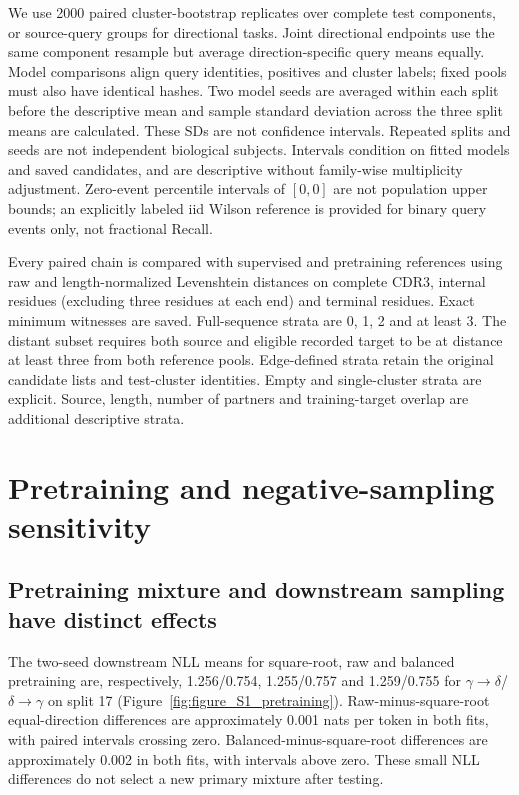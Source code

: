 \documentclass[a4paper,11pt]{article}
\newcommand{\gtd}{\ensuremath{\gamma\!\rightarrow\!\delta}}
\newcommand{\dtg}{\ensuremath{\delta\!\rightarrow\!\gamma}}
\begin{document}
We use 2000 paired cluster-bootstrap replicates over complete test components,
or source-query groups for directional tasks. Joint directional endpoints use
the same component resample but average direction-specific query means equally.
Model comparisons align query identities, positives and cluster labels; fixed
pools must also have identical hashes. Two model seeds are averaged within each
split before the descriptive mean and sample standard deviation across the
three split means are calculated. These SDs are not confidence intervals.
Repeated splits and seeds are not independent biological subjects. Intervals
condition on fitted models and saved candidates, and are descriptive without
family-wise multiplicity adjustment. Zero-event percentile intervals of $[0,0]$
are not population upper bounds; an explicitly labeled iid Wilson reference is
provided for binary query events only, not fractional Recall.

Every paired chain is compared with supervised and pretraining references using
raw and length-normalized Levenshtein distances on complete CDR3, internal
residues (excluding three residues at each end) and terminal residues. Exact
minimum witnesses are saved. Full-sequence strata are 0, 1, 2 and at least 3.
The distant subset requires both source and eligible recorded target to be at
distance at least three from both reference pools. Edge-defined strata retain
the original candidate lists and test-cluster identities. Empty and single-cluster
strata are explicit. Source, length, number of partners and training-target
overlap are additional descriptive strata.


\section{Pretraining and negative-sampling sensitivity}
\subsection{Pretraining mixture and downstream sampling have distinct effects}
The two-seed downstream NLL means for square-root, raw and balanced pretraining
are, respectively, 1.256/0.754, 1.255/0.757 and 1.259/0.755 for \gtd{}/\dtg{}
on split 17 (Figure~\ref{fig:figure_S1_pretraining}). Raw-minus-square-root
equal-direction differences are approximately 0.001 nats per token in both
fits, with paired intervals crossing zero. Balanced-minus-square-root
differences are approximately 0.002 in both fits, with intervals above zero.
These small NLL differences do not select a new primary mixture after testing.
\end{document}
